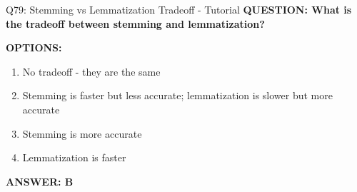 \documentclass[8pt]{beamer}
\begin{document}
	\begin{frame}{Q79: Stemming vs Lemmatization Tradeoff - Tutorial}
		\fontsize{6.5}{7.5}\selectfont
		\textbf{QUESTION: What is the tradeoff between stemming and lemmatization?}
		
		\vspace{0.1cm}
		\textbf{OPTIONS:}
		\begin{enumerate}
			\item No tradeoff - they are the same
			\item Stemming is faster but less accurate; lemmatization is slower but more accurate
			\item Stemming is more accurate
			\item Lemmatization is faster
		\end{enumerate}
		
		\vspace{0.1cm}
		\textcolor{myblue}{\textbf{ANSWER: B}}
		

\end{frame}
\end{document}

